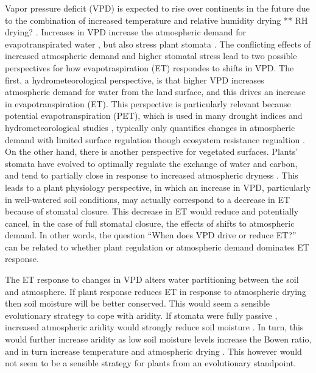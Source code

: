 \documentclass[draft,linenumbers]{gcbjournal}
\begin{document}
Vapor pressure deficit (VPD) is expected to rise over continents in the future due to the combination of increased temperature and relative humidity drying ** RH drying? \citep{Byrne_2013}. Increases in VPD increase the atmospheric demand for evapotranspirated water \citep{Penman_1948, Monteith_1965}, but also stress plant stomata \citep{Leuning_1990, MEDLYN_2011}. The conflicting effects of increased atmospheric demand and higher stomatal stress lead to two possible perspectives for how evapotraspiration (ET) respondes to shifts in VPD. The first, a hydrometeorological perspective, is that higher VPD increases atmospheric demand for water from the land surface, and this drives an increase in evapotranspiration (ET). This perspective is particularly relevant because potential evapotranspiration (PET), which is used in many drought indices and hydrometeorological studies \citep[e.g.,][]{Heim_2002, Scheff_2015}, typically only quantifies changes in atmospheric demand with limited surface regulation though ecosystem resistance regualtion \citep{Swann_2016}. On the other hand, there is another perspective for vegetated surfaces. Plants' stomata have evolved to optimally regulate the exchange of water and carbon, and tend to partially close in response to increased atmospheric dryness \citep{Ball_1987, Leuning_1990, MEDLYN_2011}. This leads to a plant physiology perspective, in which an increase in VPD, particularly in well-watered soil conditions, may actually correspond to a decrease in ET because of stomatal closure. This decrease in ET would reduce and potentially cancel, in the case of full stomatal closure, the effects of shifts to atmospheric demand. In other words, the  question ``When does VPD drive or reduce ET?'' can be related to whether plant regulation or atmospheric demand dominates ET response.

The ET response to changes in VPD alters water partitioning between the soil and atmosphere. If plant response reduces ET in response to atmospheric drying then soil moisture will be better conserved. This would seem a sensible evolutionary strategy to cope with aridity. If stomata were fully passive \citep [similar to soil pores, e.g. ][]{Or_2013}, increased atmospheric aridity would strongly reduce soil moisture \citep{Berg_2017}. In turn, this would further increase aridity as low soil moisture levels increase the Bowen ratio, and in turn increase temperature and atmospheric drying \citep[][]{Bouchet_1963, Morton_1965, Brutsaert_1999, Ozdogan_2006, Salvucci_2013, Gentine_2016, Berg_2016}. This however would not seem to be a sensible strategy for plants from an evolutionary standpoint.
\end{document}
